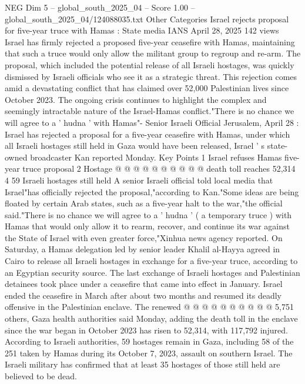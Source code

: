 \begin{textsample}{NEG Dim 5 – global\_south\_2025\_04 – Score 1.00 – global\_south\_2025\_04/124088035.txt}  \label{ex:f5_neg_367}
Other Categories Israel rejects proposal for five-year truce with Hamas : State media IANS April 28, 2025 142 views Israel has firmly rejected a proposed five-year ceasefire with Hamas, maintaining that such a truce would only allow the militant group to regroup and re-arm.
The proposal, which included the potential release of all Israeli hostages, was quickly dismissed by Israeli officials who see it as a strategic threat.
This rejection comes amid a devastating conflict that has claimed over 52,000 Palestinian lives since October 2023.
The ongoing crisis continues to highlight the complex and seemingly intractable nature of the Israel-Hamas conflict."There is no chance we will agree to a ' hudna ' with Hamas"- Senior Israeli Official Jerusalem, April 28 : Israel has rejected a proposal for a five-year ceasefire with Hamas, under which all Israeli hostages still held in Gaza would have been released, Israel ' s state-owned broadcaster Kan reported Monday.
Key Points 1 Israel refuses Hamas five-year truce proposal 2 Hostage @ @ @ @ @ @ @ @ @ @ death toll reaches 52,314 4 59 Israeli hostages still held A senior Israeli official told local media that Israel"has officially rejected the proposal,"according to Kan."Some ideas are being floated by certain Arab states, such as a five-year halt to the war,"the official said."There is no chance we will agree to a ' hudna ' ( a temporary truce ) with Hamas that would only allow it to rearm, recover, and continue its war against the State of Israel with even greater force,"Xinhua news agency reported.
On Saturday, a Hamas delegation led by senior leader Khalil al-Hayya agreed in Cairo to release all Israeli hostages in exchange for a five-year truce, according to an Egyptian security source.
The last exchange of Israeli hostages and Palestinian detainees took place under a ceasefire that came into effect in January.
Israel ended the ceasefire in March after about two months and resumed its deadly offensive in the Palestinian enclave.
The renewed @ @ @ @ @ @ @ @ @ @ 5,751 others, Gaza health authorities said Monday, adding the death toll in the enclave since the war began in October 2023 has risen to 52,314, with 117,792 injured.
According to Israeli authorities, 59 hostages remain in Gaza, including 58 of the 251 taken by Hamas during its October 7, 2023, assault on southern Israel.
The Israeli military has confirmed that at least 35 hostages of those still held are believed to be dead.

\end{textsample}
